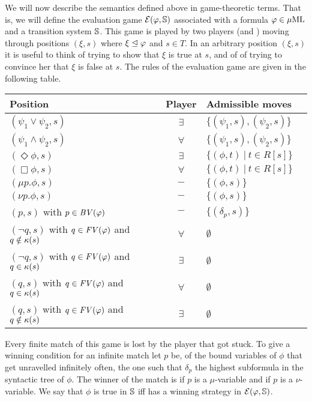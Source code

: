 We will now describe the semantics defined above in game-theoretic terms. 
That is, we will define the evaluation game $\mathcal{E}(\varphi,\mathbb{S})$ associated with
a formula $\varphi \in \mu\mathrm{ML}$ and a transition system $\mathbb{S}$. 
This game is played by two players (\eloise and \abelard) moving through 
positions $(\xi,s)$ where $\xi \trianglelefteq \varphi$ and $s \in T$.
In an arbitrary position $(\xi,s)$ it is useful to think of \eloise trying to
show that $\xi$ is true at $s$, and of \abelard of trying to convince her that 
$\xi$ is false at $s$. 
The rules of the evaluation game are given in  the following table.%
\begin{center}
\begin{tabular}{|l|c|l|c|}
\hline
Position & Player & Admissible moves
\\ \hline
   $(\psi_1 \vee \psi_2,s)$   & $\exists$ & $\{(\psi_1,s),(\psi_2,s) \}$ 
\\ $(\psi_1 \wedge \psi_2,s)$ & $\forall$ & $\{(\psi_1,s),(\psi_2,s) \}$ 
\\ $(\Diamond\phi,s)$         & $\exists$ & $\{(\phi,t)\ |\ t \in R[s] \}$ 
\\ $(\Box\phi,s)$             & $\forall$ & $\{(\phi,t)\ |\ t \in R[s] \}$ 
\\ $(\mu p.\phi,s)$           & $-$       & $\{(\phi,s) \}$ 
\\ $(\nu p.\phi,s)$           & $-$       & $\{(\phi,s) \}$ 
\\ $(p,s)$ with $p \in \mathit{BV}(\varphi)$ & $-$ & $\{(\delta_p,s) \}$ 
\\ $(\lnot q,s)$ with $q \in \mathit{FV}(\varphi)$ and $q \notin \kappa(s)$ 
   & $\forall$ & $\emptyset$
\\ $(\lnot q,s)$ with $q \in \mathit{FV}(\varphi)$ and $q \in \kappa(s)$ 
   & $\exists$ & $\emptyset$
\\ $(q,s)$ with $q \in \mathit{FV}(\varphi)$ and $q \in \kappa(s)$ 
   & $\forall$ & $\emptyset$
\\ $(q,s)$ with $q \in \mathit{FV}(\varphi)$ and $q \notin \kappa(s)$ 
   & $\exists$ & $\emptyset$
\\ \hline
\end{tabular}
\end{center}
Every finite match of this game is lost by the player that got stuck. 
To give a winning condition for an infinite match let $p$ be, of the bound 
variables of $\phi$ that get unravelled infinitely often, the one such that 
$\delta_{p}$ the highest subformula in the syntactic tree of $\phi$. 
The winner of the match is \abelard if $p$ is a $\mu$-variable and \eloise if 
$p$ is a $\nu$-variable.
We say that $\phi$ is true in $\mathbb{S}$ iff \eloise has a winning strategy in 
$\mathcal{E}(\varphi,\mathbb{S})$.

